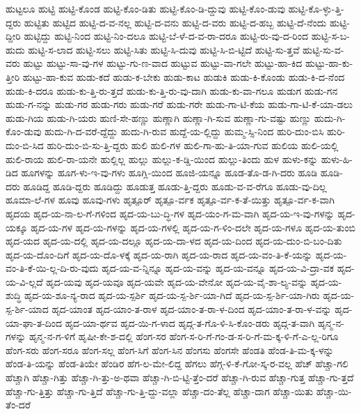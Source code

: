 {ಹುಟ್ಟಲೂ
ಹುಟ್ಟಿ
ಹುಟ್ಟಿ-ಕೊಂಡ
ಹುಟ್ಟಿ-ಕೊಂ-ಡಿತು
ಹುಟ್ಟಿ-ಕೊಂ-ಡಿ-ದ್ದುವು
ಹುಟ್ಟಿ-ಕೊಂ-ಡುವು
ಹುಟ್ಟಿ-ಕೊ-ಳ್ಳು-ತ್ತಿ-ದ್ದರು
ಹುಟ್ಟಿತು
ಹುಟ್ಟಿದ
ಹುಟ್ಟಿ-ದ-ವ-ನಲ್ಲ
ಹುಟ್ಟಿ-ದ-ವನು
ಹುಟ್ಟಿ-ದ-ವರು
ಹುಟ್ಟಿ-ದ-ಹಬ್ಬ
ಹುಟ್ಟಿ-ದೆ-ನೆಂದು
ಹುಟ್ಟಿ-ದ್ದೀರಿ
ಹುಟ್ಟಿದ್ದು
ಹುಟ್ಟಿ-ನಿಂದ
ಹುಟ್ಟಿ-ನಿಂ-ದಲೂ
ಹುಟ್ಟಿ-ಬೆ-ಳೆ-ದ-ವ-ರಾ-ದರೂ
ಹುಟ್ಟಿ-ರು-ವು-ದ-ರಿಂದ
ಹುಟ್ಟಿ-ಸ-ಬ-ಹುದು
ಹುಟ್ಟಿ-ಸ-ಲಾದ
ಹುಟ್ಟಿ-ಸಲು
ಹುಟ್ಟಿ-ಸಿತು
ಹುಟ್ಟಿ-ಸಿ-ದುವು
ಹುಟ್ಟಿ-ಸಿ-ಬಿ-ಟ್ಟಿದೆ
ಹುಟ್ಟಿ-ಸು-ತ್ತವೆ
ಹುಟ್ಟಿ-ಸು-ವ-ವರು
ಹುಟ್ಟು
ಹುಟ್ಟು-ಸಾ-ವು-ಗಳ
ಹುಟ್ಟು-ಗು-ಣ-ವಾದ
ಹುಟ್ಟುವ
ಹುಟ್ಟು-ವಾ-ಗಲೇ
ಹುಟ್ಟು-ಹಾ-ಕಿದ
ಹುಟ್ಟು-ಹಾ-ಕು-ತ್ತೀರಿ
ಹುಟ್ಟು-ಹಾ-ಕುವ
ಹುಡು-ಕದೆ
ಹುಡು-ಕ-ಬೇಕು
ಹುಡು-ಕಾಟ
ಹುಡುಕಿ
ಹುಡು-ಕಿ-ಕೊಂಡು
ಹುಡು-ಕಿ-ದ-ನೆಂದ
ಹುಡು-ಕಿ-ದರೂ
ಹುಡು-ಕು-ತ್ತಿ-ರು-ತ್ತದೆ
ಹುಡು-ಕು-ತ್ತಿ-ರು-ವು-ದಾಗಿ
ಹುಡು-ಕು-ವಾ-ಗಲೂ
ಹುಡುಗ
ಹುಡು-ಗನ
ಹುಡು-ಗ-ನನ್ನು
ಹುಡು-ಗರ
ಹುಡು-ಗರು
ಹುಡು-ಗರೆ
ಹುಡು-ಗರೇ
ಹುಡು-ಗಾ-ಟಿ-ಕೆಯ
ಹುಡು-ಗಾ-ಟಿ-ಕೆ-ಯಾ-ಡಲು
ಹುಡು-ಗಿಯ
ಹುಡು-ಗಿ-ಯರು
ಹುಣಿ-ಸೇ-ಹಣ್ಣು
ಹುಣ್ಣಾಗಿ
ಹುಣ್ಣಾ-ಗಿ-ಸುವ
ಹುಣ್ಣಾ-ಗು-ವಷ್ಟು
ಹುಣ್ಣು
ಹುದು-ಗಿ-ಕೊಂ-ಡುವು
ಹುದು-ಗಿ-ದ-ವರೆ-ದ್ದೆದ್ದು
ಹುದು-ಗಿ-ರುವ
ಹುದ್ದೆ-ಯ-ಲ್ಲಿದ್ದು
ಹುಮ್ಮ-ಸ್ಸಿ-ನಿಂದ
ಹುರಿ-ದುಂ-ಬಿಸಿ
ಹುರಿ-ದುಂ-ಬಿ-ಸಿದ
ಹುರಿ-ದುಂ-ಬಿ-ಸು-ತ್ತಿ-ದ್ದರು
ಹುಲಿ
ಹುಲಿ-ಗಳ
ಹುಲಿ-ಗಾ-ಹು-ತಿ-ಯಾ-ಗುವ
ಹುಲಿಯ
ಹುಲಿ-ಯಲ್ಲಿ
ಹುಲಿ-ರಾಯ
ಹುಲಿ-ರಾ-ಯನೇ
ಹುಲ್ಲಿಲ್ಲ
ಹುಲ್ಲು
ಹುಲ್ಲು-ಕ-ಡ್ಡಿ-ಯಿಂದ
ಹುಲ್ಲು-ತಿಂದು
ಹುಳ
ಹುಳು-ಕನ್ನು
ಹುಳು-ಹಿ-ಡಿದ
ಹೂಗಳನ್ನು
ಹೂಗ-ಳು-ಇ-ವು-ಗಳು
ಹೂಗ್ಲಿ-ಯಿಂದ
ಹೂಜಿ-ಯನ್ನೂ
ಹೂಡ-ತೊ-ಡ-ಗಿ-ದರು
ಹೂಡಿ
ಹೂಡಿ-ದರು
ಹೂಡಿದ್ದ
ಹೂಡಿ-ದ್ದರು
ಹೂಡಿದ್ದು
ಹೂಡುತ್ತ
ಹೂಡು-ತ್ತಿ-ದ್ದರು
ಹೂಡು-ವ-ವ-ರೆಗೂ
ಹೂಡು-ವು-ದಿಲ್ಲ
ಹೂಮಾ-ಲೆ-ಗಳ
ಹೂವು
ಹೂವು-ಗಳು
ಹೃತ್ಪೂರ್
ಹೃತ್ಪೂ-ರ್ವಕ
ಹೃತ್ಪೂ-ರ್ವ-ಕ-ತೆ-ಯಿತ್ತು
ಹೃತ್ಪೂ-ರ್ವ-ಕ-ವಾಗಿ
ಹೃದಯ
ಹೃದ-ಯ-ನಾ-ಲ-ಗೆ-ಗಳಿಂದ
ಹೃದ-ಯ-ಬು-ದ್ಧಿ-ಗಳ
ಹೃದ-ಯಂ-ಗ-ಮ-ವಾಗಿ
ಹೃದ-ಯ-ಇ-ವು-ಗಳನ್ನು
ಹೃದ-ಯಕ್ಕೂ
ಹೃದ-ಯ-ಗಳ
ಹೃದ-ಯ-ಗಳನ್ನು
ಹೃದ-ಯ-ಗಳಲ್ಲಿ
ಹೃದ-ಯ-ಗ-ಳಿಂ-ದಲೇ
ಹೃದ-ಯ-ಗಳೂ
ಹೃದ-ಯ-ತುಂಬಿ
ಹೃದ-ಯದ
ಹೃದ-ಯ-ದಲ್ಲಿ
ಹೃದ-ಯ-ದಲ್ಲೂ
ಹೃದ-ಯ-ದಾ-ಳದ
ಹೃದ-ಯ-ದಿಂದ
ಹೃದ-ಯ-ದುಂ-ಬಿ-ಬಂ-ದಿತು
ಹೃದ-ಯ-ದೊಂ-ದಿಗೆ
ಹೃದ-ಯ-ದೊ-ಳಕ್ಕೆ
ಹೃದ-ಯ-ರಾಗಿ
ಹೃದ-ಯ-ರಾದ
ಹೃದ-ಯ-ವಂ-ತಿ-ಕೆ-ಯನ್ನು
ಹೃದ-ಯ-ವಂ-ತಿ-ಕೆ-ಯಿ-ಲ್ಲ-ದಿ-ರು-ವುದು
ಹೃದ-ಯ-ವ-ನ್ನಿನ್ನೂ
ಹೃದ-ಯ-ವನ್ನು
ಹೃದ-ಯ-ವನ್ನೂ
ಹೃದ-ಯ-ವಿ-ದ್ರಾ-ವಕ
ಹೃದ-ಯ-ವಿ-ಲ್ಲದೆ
ಹೃದ-ಯವು
ಹೃದ-ಯವೂ
ಹೃದ-ಯವೇ
ಹೃದ-ಯ-ವೇನೋ
ಹೃದ-ಯ-ವೈ-ಶಾ-ಲ್ಯ-ವನ್ನು
ಹೃದ-ಯ-ಶುದ್ಧಿ
ಹೃದ-ಯ-ಶೂ-ನ್ಯ-ರಾದ
ಹೃದ-ಯ-ಸ್ಪರ್ಶಿ
ಹೃದ-ಯ-ಸ್ಪ-ರ್ಶಿ-ಯಾ-ಗಿದೆ
ಹೃದ-ಯ-ಸ್ಪ-ರ್ಶಿ-ಯಾ-ಗಿರು
ಹೃದ-ಯ-ಸ್ಪ-ರ್ಶಿ-ಯಾದ
ಹೃದ-ಯಾಂತ
ಹೃದ-ಯಾಂ-ತ-ರಾಳ
ಹೃದ-ಯಾಂ-ತ-ರಾ-ಳ-ದಿಂದ
ಹೃದ-ಯಾಂ-ತ-ರಾ-ಳ-ವನ್ನು
ಹೃದ-ಯಾ-ಘಾ-ತ-ದಿಂದ
ಹೃದ-ಯಾ-ರ್ಥವ
ಹೃದ-ಯಿ-ಗ-ಳಾದ
ಹೃದ್ಗ-ತ-ಗೊ-ಳಿ-ಸಿ-ಕೊಂ-ಡರು
ಹೃದ್ಗ-ತ-ವಾಗಿ
ಹೃನ್ಮ-ನ-ಗಳನ್ನು
ಹೃನ್ಮ-ನ-ಗ-ಳಿಗೆ
ಹೃಷೀ-ಕೇ-ಶ-ದಲ್ಲಿ
ಹೆಂಗ-ಸರ
ಹೆಂಗ-ಸ-ರಿ-ಗೆ-ಗಂ-ಡ-ಸ-ರಿ-ಗೆ-ಮ-ಕ್ಕ-ಳಿ-ಗೆ-ಎ-ಲ್ಲ-ರಿಗೂ
ಹೆಂಗ-ಸರು
ಹೆಂಗ-ಸರೂ
ಹೆಂಗ-ಸಲ್ಲ
ಹೆಂಗ-ಸಿಗೆ
ಹೆಂಗ-ಸಿನ
ಹೆಂಗಸು
ಹೆಂಗಸೇ
ಹೆಂಡತಿ
ಹೆಂಡ-ತಿ-ಮ-ಕ್ಕ-ಳನ್ನು
ಹೆಂಡ-ತಿ-ಯನ್ನು
ಹೆಂಡ-ತಿಯೇ
ಹೆಂಡಿರ
ಹೆಗ-ಲ-ಮೇ-ಲಿದ್ದ
ಹೆಗಲು
ಹೆಗ್ಗ-ಳಿ-ಕೆ-ಗೋ-ಸ್ಕ-ರ-ವಲ್ಲ
ಹೆಚ್
ಹೆಚ್ಚಾ-ಗಲಿ
ಹೆಚ್ಚಾಗಿ
ಹೆಚ್ಚಾ-ಗಿತ್ತು
ಹೆಚ್ಚಾ-ಗಿ-ತ್ತು-ಅ-ಥವಾ
ಹೆಚ್ಚಾ-ಗಿ-ಬಿ-ಟ್ಟಿ-ತ್ತೆಂ-ದರೆ
ಹೆಚ್ಚಾ-ಗಿ-ರುವ
ಹೆಚ್ಚಾ-ಗುತ್ತ
ಹೆಚ್ಚಾ-ಗು-ತ್ತದೆ
ಹೆಚ್ಚಾ-ಗು-ತ್ತಿತ್ತು
ಹೆಚ್ಚಾ-ಗು-ತ್ತಿದೆ
ಹೆಚ್ಚಾ-ಗು-ತ್ತಿ-ದ್ದು-ವಲ್ಲಾ
ಹೆಚ್ಚಾ-ದಂ-ತೆಲ್ಲ
ಹೆಚ್ಚಾ-ದಾಗ
ಹೆಚ್ಚಾ-ಯಿತು
ಹೆಚ್ಚಾ-ಯಿ-ತೆಂ-ದರೆ
}
